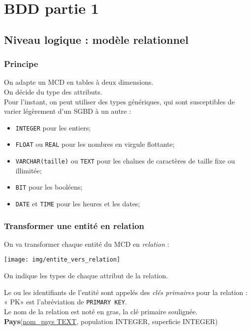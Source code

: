 \documentclass[10pt,firamath,cours]{nsi}
\begin{document}
\chapter{BDD partie 1}


\section{Niveau logique : modèle relationnel}
\subsection{Principe}
On adapte un MCD en tables à deux dimensions.\\
On décide du type des attributs.\\
Pour l'instant, on peut utiliser des types génériques, qui sont susceptibles de varier légèrement d'un SGBD à un autre :
\begin{itemize}
	\item	\texttt{INTEGER} pour les entiers;
	\item	\texttt{FLOAT} ou \texttt{REAL} pour les nombres en virgule flottante;
    \item	\texttt{VARCHAR(taille)} ou \texttt{TEXT} pour les chaînes de caractères de taille fixe ou illimitée;
    \item 	\texttt{BIT} pour les booléens;
    \item 	\texttt{DATE} et \texttt{TIME} pour les heures et les dates;
\end{itemize}



\subsection{Transformer une entité en relation}
	On va transformer chaque entité du MCD en \textit{relation} :
	\begin{center}
		\texttt{[image: img/entite\_vers\_relation]}
	\end{center}
	On indique les types de chaque attribut de la relation.

	Le ou les identifiants de l'entité sont appelés des \textit{clés primaires} pour la relation : « PK» est l'abréviation de \texttt{PRIMARY KEY}.\\
	Le nom de la relation est noté en gras, la clé primaire soulignée.\\

	\textbf{Pays}(\uline{nom\_pays TEXT}, population INTEGER, superficie INTEGER)\\
\end{document}
